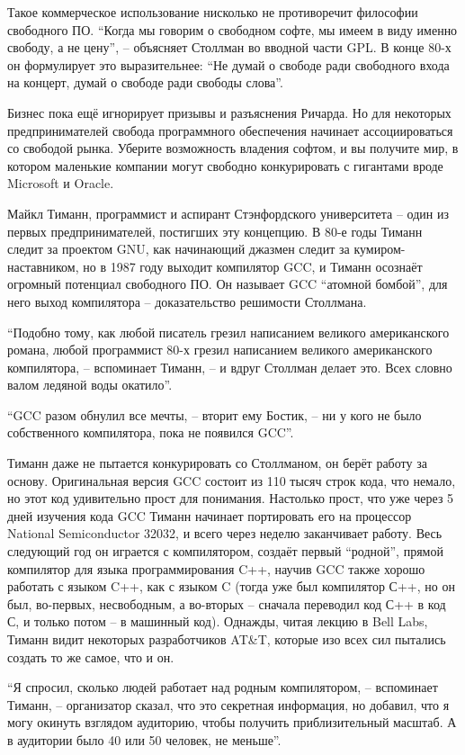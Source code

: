 Такое коммерческое использование нисколько не противоречит философии свободного ПО. \enquote{Когда мы говорим о свободном софте, мы имеем в виду именно свободу, а не цену}, -- объясняет Столлман во вводной части GPL. В конце 80-х он формулирует это выразительнее: \enquote{Не думай о свободе ради свободного входа на концерт, думай о свободе ради свободы слова}.

Бизнес пока ещё игнорирует призывы и разъяснения Ричарда. Но для некоторых предпринимателей свобода программного обеспечения начинает ассоциироваться со свободой рынка. Уберите возможность владения софтом, и вы получите мир, в котором маленькие компании могут свободно конкурировать с гигантами вроде Microsoft и Oracle.

Майкл Тиманн, программист и аспирант Стэнфордского университета -- один из первых предпринимателей, постигших эту концепцию. В 80-е годы Тиманн следит за проектом GNU, как начинающий джазмен следит за кумиром-наставником, но в 1987 году выходит компилятор GCC, и Тиманн осознаёт огромный потенциал свободного ПО. Он называет GCC \enquote{атомной бомбой}, для него выход компилятора -- доказательство решимости Столлмана.

\enquote{Подобно тому, как любой писатель грезил написанием великого американского романа, любой программист 80-х грезил написанием великого американского компилятора, -- вспоминает Тиманн, -- и вдруг Столлман делает это. Всех словно валом ледяной воды окатило}.

\enquote{GCC разом обнулил все мечты, -- вторит ему Бостик, -- ни у кого не было собственного компилятора, пока не появился GCC}.

Тиманн даже не пытается конкурировать со Столлманом, он берёт работу за основу. Оригинальная версия GCC состоит из 110 тысяч строк кода, что немало, но этот код удивительно прост для понимания. Настолько прост, что уже через 5 дней изучения кода GCC Тиманн начинает портировать его на процессор National Semiconductor 32032, и всего через неделю заканчивает работу. Весь следующий год он играется с компилятором, создаёт первый \enquote{родной}, прямой компилятор для языка программирования C++, научив GCC также хорошо работать с языком C++, как с языком C (тогда уже был компилятор С++, но он был, во-первых, несвободным, а во-вторых -- сначала переводил код С++ в код С, и только потом -- в машинный код). Однажды, читая лекцию в Bell Labs, Тиманн видит некоторых разработчиков AT\&T, которые изо всех сил пытались создать то же самое, что и он.

\enquote{Я спросил, сколько людей работает над родным компилятором, -- вспоминает Тиманн, -- организатор сказал, что это секретная информация, но добавил, что я могу окинуть взглядом аудиторию, чтобы получить приблизительный масштаб. А в аудитории было 40 или 50 человек, не меньше}.

